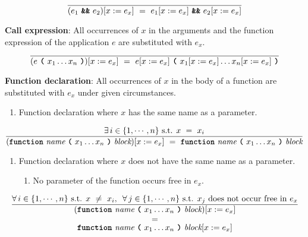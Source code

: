\[
\frac{
}{
  (e_1\  \textbf{\texttt{\&\&}}\ e_2)[x := e_x]
  \ = \ 
  e_1[x := e_x]\  \textbf{\texttt{\&\&}}\ e_2[x := e_x]
}
\]

\vspace{10mm}
\textbf{Call expression}: All occurrences of $x$ in the arguments and the function expression of the application $e$ are substituted with $e_x$.
\[
\frac{
}{
  (e \ \textbf{\texttt{(}}\ x_1 \ldots x_n \ \textbf{\texttt{)}})[x := e_x]
  \ = \ 
  e[x := e_x] \ \textbf{\texttt{(}}\ x_1[x := e_x] \ldots x_n[x := e_x] \ \textbf{\texttt{)}}
}
\]

\pagebreak
\textbf{Function declaration}: All occurrences of $x$ in the body of a function are substituted with $e_x$ under given circumstances.
\begin{enumerate}[label=\large\protect\textcircled{\small\arabic*}]
    \item Function declaration where $x$ has the same name as a parameter.
\end{enumerate}
    \[
    \frac{
      \exists \, i \in \{1, \cdots, n\} \text{ s.t. } x \ = \ x_i
    }{
      (\textbf{\texttt{function}}\  \textit{name} \ \textbf{\texttt{(}}\ x_1 \ldots x_n \ \textbf{\texttt{)}}\ \textit{block})[x := e_x]
      \ = \ 
      \textbf{\texttt{function}}\  \textit{name} \ \textbf{\texttt{(}}\ x_1 \ldots x_n \ \textbf{\texttt{)}}\ \textit{block}
    }
    \]
\vspace{3mm}
\begin{enumerate}[label=\large\protect\textcircled{\small\arabic*}, start=2]
    \item Function declaration where $x$ does not have the same name as a parameter.
    \begin{enumerate}[label=(\,\roman*\,)]
        \item No parameter of the function occurs free in $e_x$.
    \end{enumerate}
\end{enumerate}
        \[
        \frac{
          \forall \, i \in \{1, \cdots, n\} \text{ s.t. } x \ \neq \ x_i \text{, } \ \forall \, j \in \{1, \cdots, n\} \text{ s.t. } x_j \text{ does not occur free in $e_x$}
        }{
          \substack{\substack{\displaystyle{(\textbf{\texttt{function}}\  \textit{name} \ \textbf{\texttt{(}}\ x_1 \ldots x_n \ \textbf{\texttt{)}}\ \textit{block})[x := e_x]} \vspace{1.5mm} \\ \vspace{0.5mm} \displaystyle{=}} \\  \displaystyle{ \textbf{\texttt{function}}\  \textit{name} \ \textbf{\texttt{(}}\ x_1 \ldots x_n \ \textbf{\texttt{)}}\ \textit{block}[x := e_x]}}
        }
        \]
